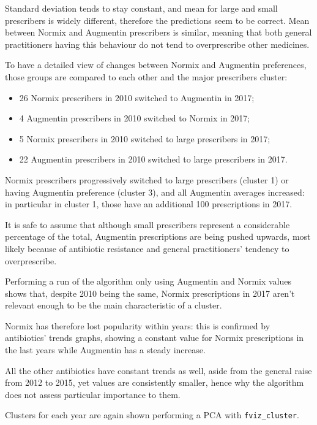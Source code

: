 Standard deviation tends to stay constant, and mean for large and small prescribers is widely different, therefore the predictions seem to be correct. Mean between Normix and Augmentin prescribers is similar, meaning that both general practitioners having this behaviour do not tend to overprescribe other medicines.

To have a detailed view of changes between Normix and Augmentin preferences, those groups are compared to each other and the major prescribers cluster:
\begin{itemize}
	\item 26 Normix prescribers in 2010 switched to Augmentin in 2017;
	\item 4 Augmentin prescribers in 2010 switched to Normix in 2017;
	\item 5 Normix prescribers in 2010 switched to large prescribers in 2017;
	\item 22 Augmentin prescribers in 2010 switched to large prescribers in 2017.
\end{itemize}

Normix prescribers progressively switched to large prescribers (cluster 1) or having Augmentin preference (cluster 3), and all Augmentin averages increased: in particular in cluster 1, those have an additional 100 prescriptions in 2017.

It is safe to assume that although small prescribers represent a considerable percentage of the total, Augmentin prescriptions are being pushed upwards, most likely because of antibiotic resistance and general practitioners' tendency to overprescribe.

Performing a run of the algorithm only using Augmentin and Normix values shows that, despite 2010 being the same, Normix prescriptions in 2017 aren't relevant enough to be the main characteristic of a cluster. 

Normix has therefore lost popularity within years: this is confirmed by antibiotics' trends graphs, showing a constant value for Normix prescriptions in the last years while Augmentin has a steady increase.

All the other antibiotics have constant trends as well, aside from the general raise from 2012 to 2015, yet values are consistently smaller, hence why the algorithm does not assess particular importance to them. 

Clusters for each year are again shown performing a PCA with \texttt{fviz\_cluster}.

